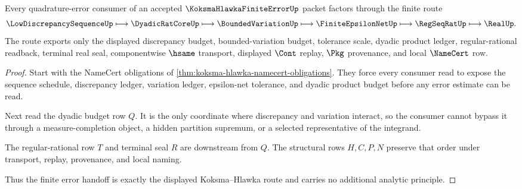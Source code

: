 \begin{theorem}
\label{thm:koksma-hlawka-error-handoff}
Every quadrature-error consumer of an accepted $\KoksmaHlawkaFiniteErrorUp$ packet factors through the finite route
$$
\LowDiscrepancySequenceUp \longmapsto \DyadicRatCoreUp \longmapsto \BoundedVariationUp \longmapsto \FiniteEpsilonNetUp \longmapsto \RegSeqRatUp \longmapsto \RealUp .
$$
The route exports only the displayed discrepancy budget, bounded-variation budget, tolerance scale, dyadic product ledger, regular-rational readback, terminal real seal, componentwise $\hsame$ transport, displayed $\Cont$ replay, $\Pkg$ provenance, and local $\NameCert$ row.
\end{theorem}
\begin{proof}
Start with the NameCert obligations of \autoref{thm:koksma-hlawka-namecert-obligations}. They force every consumer read to expose the sequence schedule, discrepancy ledger, variation ledger, epsilon-net tolerance, and dyadic product budget before any error estimate can be read.

Next read the dyadic budget row $Q$. It is the only coordinate where discrepancy and variation interact, so the consumer cannot bypass it through a measure-completion object, a hidden partition supremum, or a selected representative of the integrand.

The regular-rational row $T$ and terminal seal $R$ are downstream from $Q$. The structural rows $H,C,P,N$ preserve that order under transport, replay, provenance, and local naming.

Thus the finite error handoff is exactly the displayed Koksma--Hlawka route and carries no additional analytic principle.
\end{proof}


